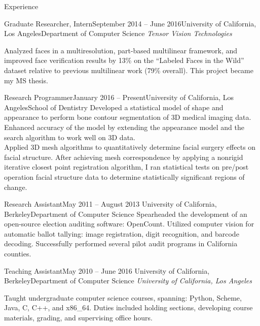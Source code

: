 \documentclass{resume}
\begin{document}
\begin{component}{Experience}
	\begin{position}{Graduate Researcher, Intern}{September 2014 -- June 2016}{University of California, Los Angeles}{Department of Computer Science}
	\emph{Tensor Vision Technologies}

    {Analyzed faces in a multiresolution, part-based multilinear framework, and improved face verification results by 13\% on the ``Labeled Faces in the Wild'' dataset relative to previous multilinear work (79\% overall).
This project became my MS thesis.
}
	\end{position}

\vspace{-0.25em}

    \begin{position}{Research Programmer}{January 2016 -- Present}{University of California, Los Angeles}{School of Dentistry}
{
Developed a statistical model of shape and appearance to perform bone contour segmentation of 3D medical imaging data.
Enhanced accuracy of the model by extending the appearance model and the search algorithm to work well on 3D data.
\\
Applied 3D mesh algorithms to quantitatively determine facial surgery effects on facial structure.
After achieving mesh correspondence by applying a nonrigid iterative closest point registration algorithm, I ran statistical tests on pre/post operation facial structure data to determine statistically significant regions of change.
}
      \end{position}

\vspace{-0.25em}

	\begin{position}{Research Assistant}{May 2011 -- August 2013}
	 	{University of California, Berkeley}{Department of Computer Science}
	{Spearheaded the development of an open-source election auditing software: OpenCount.
     Utilized computer vision for automatic ballot tallying: image registration, digit recognition, and barcode decoding.
     Successfully performed
         several pilot audit programs in California counties.
}
	\end{position}

\vspace{-0.25em}

	\begin{position}{Teaching Assistant}{May 2010 -- June 2016}
		{University of California, Berkeley}{Department of Computer Science}
    \emph{University of California, Los Angeles}

	{Taught undergraduate computer science courses, spanning: Python, Scheme, Java, C, C++, and x86\_64.
	 Duties included holding sections, developing course materials, grading, and supervising office hours.}
	\end{position}
\end{component}
\end{document}
